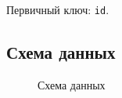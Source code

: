 \begin{enumerate}
    \tab Первичный ключ: \texttt{id}.
\end{enumerate}


\subsection{Схема данных}


\begin{figure}[H]
    \caption{Схема данных}
    \label{fig:schema}
\end{figure}


